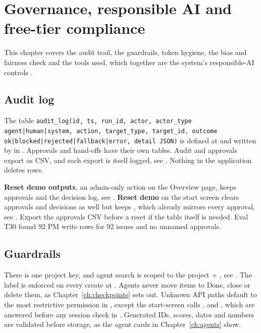\chapter{Governance, responsible AI and free-tier compliance}
\label{ch:governance}

This chapter covers the audit trail, the guardrails, token hygiene, the bias and fairness check and the tools used, which together are the system's responsible-AI controls \parencite[cf.][]{nist2023airmf}.

\section{Audit log}

The table \texttt{audit\_log(id, ts, run\_id, actor, actor\_type agent|human|system, action, target\_type, target\_id, outcome ok|blocked|rejected|fallback|error, detail JSON)} is defined at  and written by  in . Approvals and hand-offs have their own tables. Audit and approvals export as CSV, and each export is itself logged, see . Nothing in the application deletes  rows.

\textbf{Reset demo outputs}, an admin-only action on the Overview page, keeps approvals and the decision log, see . \textbf{Reset demo} on the start screen clears approvals and decisions as well but keeps , which already mirrors every approval, see . Export the approvals CSV before a reset if the table itself is needed. Eval T30 found 92 PM write rows for 92 issues and no unnamed approvals.

\section{Guardrails}

There is one project key, and agent search is scoped to the project + , see . The label is enforced on every create at . Agents never move items to Done, close or delete them, as Chapter~\ref{ch:checkpoints} sets out. Unknown API paths default to the most restrictive permission in , except the start-screen calls ,  and , which are answered before any session check in . Generated IDs, scores, dates and numbers are validated before storage, as the agent cards in Chapter~\ref{ch:agents} show.

